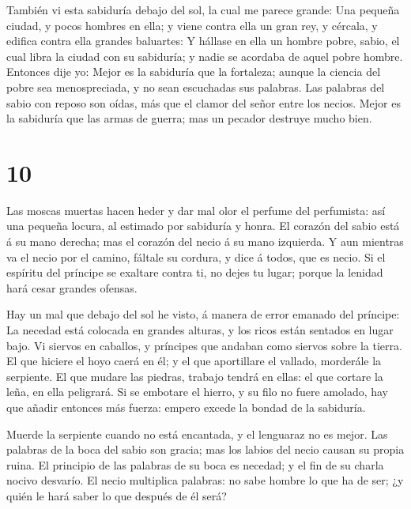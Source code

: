  También vi esta sabiduría debajo del sol, la cual me
parece grande:  Una pequeña ciudad, y pocos hombres en
ella; y viene contra ella un gran rey, y cércala, y edifica contra ella
grandes baluartes:  Y hállase en ella un hombre pobre,
sabio, el cual libra la ciudad con su sabiduría; y nadie se acordaba de
aquel pobre hombre.  Entonces dije yo: Mejor es la
sabiduría que la fortaleza; aunque la ciencia del pobre sea
menospreciada, y no sean escuchadas sus palabras.  Las
palabras del sabio con reposo son oídas, más que el clamor del señor
entre los necios.  Mejor es la sabiduría que las armas de
guerra; mas un pecador destruye mucho bien.

\hypertarget{section-9}{%
\section{10}\label{section-9}}

 Las moscas muertas hacen heder y dar mal olor el perfume
del perfumista: así una pequeña locura, al estimado por sabiduría y
honra.  El corazón del sabio está á su mano derecha; mas el
corazón del necio á su mano izquierda.  Y aun mientras va el
necio por el camino, fáltale su cordura, y dice á todos, que es necio.
 Si el espíritu del príncipe se exaltare contra ti, no dejes
tu lugar; porque la lenidad hará cesar grandes ofensas.

 Hay un mal que debajo del sol he visto, á manera de error
emanado del príncipe:  La necedad está colocada en grandes
alturas, y los ricos están sentados en lugar bajo.  Vi
siervos en caballos, y príncipes que andaban como siervos sobre la
tierra.  El que hiciere el hoyo caerá en él; y el que
aportillare el vallado, morderále la serpiente.  El que
mudare las piedras, trabajo tendrá en ellas: el que cortare la leña, en
ella peligrará.  Si se embotare el hierro, y su filo no
fuere amolado, hay que añadir entonces más fuerza: empero excede la
bondad de la sabiduría.

 Muerde la serpiente cuando no está encantada, y el
lenguaraz no es mejor.  Las palabras de la boca del sabio
son gracia; mas los labios del necio causan su propia ruina.
 El principio de las palabras de su boca es necedad; y el
fin de su charla nocivo desvarío.  El necio multiplica
palabras: no sabe hombre lo que ha de ser; ¿y quién le hará saber lo que
después de él será?

